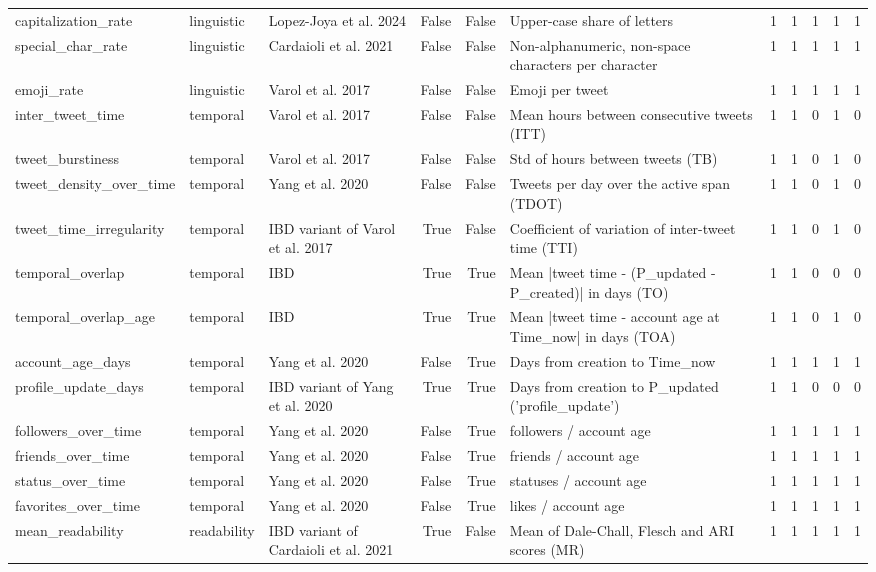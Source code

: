 \begin{tabular}{lllrrlrrrrr}
capitalization_rate & linguistic & Lopez-Joya et al. 2024 & False & False & Upper-case share of letters & 1 & 1 & 1 & 1 & 1 \\
special_char_rate & linguistic & Cardaioli et al. 2021 & False & False & Non-alphanumeric, non-space characters per character & 1 & 1 & 1 & 1 & 1 \\
emoji_rate & linguistic & Varol et al. 2017 & False & False & Emoji per tweet & 1 & 1 & 1 & 1 & 1 \\
inter_tweet_time & temporal & Varol et al. 2017 & False & False & Mean hours between consecutive tweets (ITT) & 1 & 1 & 0 & 1 & 0 \\
tweet_burstiness & temporal & Varol et al. 2017 & False & False & Std of hours between tweets (TB) & 1 & 1 & 0 & 1 & 0 \\
tweet_density_over_time & temporal & Yang et al. 2020 & False & False & Tweets per day over the active span (TDOT) & 1 & 1 & 0 & 1 & 0 \\
tweet_time_irregularity & temporal & IBD variant of Varol et al. 2017 & True & False & Coefficient of variation of inter-tweet time (TTI) & 1 & 1 & 0 & 1 & 0 \\
temporal_overlap & temporal & IBD & True & True & Mean |tweet time - (P_updated - P_created)| in days (TO) & 1 & 1 & 0 & 0 & 0 \\
temporal_overlap_age & temporal & IBD & True & True & Mean |tweet time - account age at Time_now| in days (TOA) & 1 & 1 & 0 & 1 & 0 \\
account_age_days & temporal & Yang et al. 2020 & False & True & Days from creation to Time_now & 1 & 1 & 1 & 1 & 1 \\
profile_update_days & temporal & IBD variant of Yang et al. 2020 & True & True & Days from creation to P_updated ('profile_update') & 1 & 1 & 0 & 0 & 0 \\
followers_over_time & temporal & Yang et al. 2020 & False & True & followers / account age & 1 & 1 & 1 & 1 & 1 \\
friends_over_time & temporal & Yang et al. 2020 & False & True & friends / account age & 1 & 1 & 1 & 1 & 1 \\
status_over_time & temporal & Yang et al. 2020 & False & True & statuses / account age & 1 & 1 & 1 & 1 & 1 \\
favorites_over_time & temporal & Yang et al. 2020 & False & True & likes / account age & 1 & 1 & 1 & 1 & 1 \\
mean_readability & readability & IBD variant of Cardaioli et al. 2021 & True & False & Mean of Dale-Chall, Flesch and ARI scores (MR) & 1 & 1 & 1 & 1 & 1 \\

\end{tabular}
